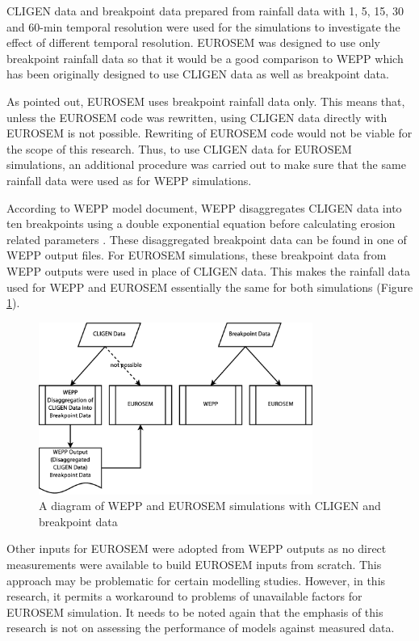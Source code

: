 CLIGEN data and breakpoint data prepared from rainfall data with 1, 5, 15,
30 and 60-min temporal resolution were used for the simulations to investigate
the effect of different temporal resolution.
EUROSEM was designed to use only breakpoint rainfall data so that it would
be a good comparison to WEPP which has been originally designed to use CLIGEN
data as well as breakpoint data.

As pointed out, EUROSEM uses breakpoint rainfall data only. This means that,
unless the EUROSEM code was rewritten, using CLIGEN data directly with EUROSEM
is not possible. Rewriting of EUROSEM code would not be viable for the scope of
this research. Thus, to use CLIGEN data for EUROSEM simulations, an additional
procedure was carried out to make sure that the same rainfall data were used as
for WEPP simulations.

According to WEPP model document, WEPP disaggregates CLIGEN data into ten
breakpoints using a double exponential equation before calculating erosion
related parameters \citep[see][\S 2.2]{flanagan1995-usda}. These disaggregated
breakpoint data can be found in one of WEPP output files. For EUROSEM
simulations, these breakpoint data from WEPP outputs were used in place of
CLIGEN data. This makes the rainfall data used for WEPP and EUROSEM essentially
the same for both simulations (Figure \ref{fig:eurosem_cligen_workaround}).

\begin{figure}[htbp]
  \centering
    \includegraphics[width=0.8\textwidth]{./img/eurosem_cligen_workaround}
  \caption{A diagram of WEPP and EUROSEM simulations with CLIGEN and breakpoint
data}
  \label{fig:eurosem_cligen_workaround}
\end{figure}

Other inputs for EUROSEM were adopted from WEPP outputs as no direct
measurements were available to build EUROSEM inputs from scratch. This approach
may be problematic for certain modelling studies. However, in this research, it
permits a workaround to problems of unavailable factors for EUROSEM simulation.
It needs to be noted again that the emphasis of this research is not on
assessing the performance of models against measured data.

